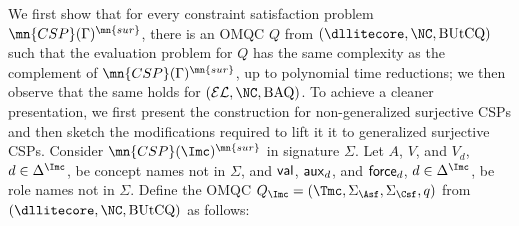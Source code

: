 \documentclass{lmcs}
\theoremstyle{definition}
\begin{document}
We first show that for every constraint satisfaction problem $\mn{CSP}(\Gamma)^{\mn{sur}}$, there is an
OMQC $Q$ from $(\dllitecore,\NC,\text{BUtCQ})$ such that the
evaluation problem for $Q$ has the same complexity as the complement
of $\mn{CSP}(\Gamma)^{\mn{sur}}$, up to polynomial time reductions; we
then observe that the same holds for $(\mathcal{EL},\NC,\text{BAQ})$.
To achieve a cleaner presentation, we first present the construction
for non-generalized surjective CSPs and then sketch the modifications
required to lift it it to generalized surjective CSPs.
Consider $\mn{CSP}(\Imc)^{\mn{sur}}$ in signature $\Sigma$. Let $A$,
$V$, and $V_{d}$, $d\in \Delta^{\Imc}$, be concept names not in
$\Sigma$, and ${\sf val}$, ${\sf aux}_{d}$, and ${\sf force}_{d}$,
$d\in \Delta^{\Imc}$, be role names not in $\Sigma$.  Define the OMQC
$Q_{\Imc}=(\Tmc,\Sigma_\Asf,\Sigma_\Csf,q)$ from
$(\dllitecore,\NC,\text{BUtCQ})$ as follows:
%
%
%
\end{document}
